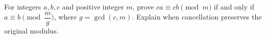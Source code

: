 For integers $a,b,c$ and positive integer $m$, prove $ca\equiv cb\pmod m$ if and only if $a\equiv b\pmod{\dfrac{m}{g}}$, where $g=\gcd(c,m)$. Explain when cancellation preserves the original modulus.
